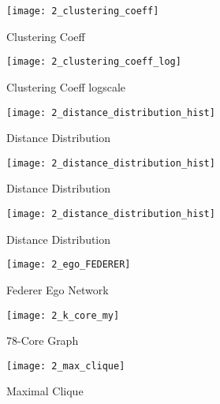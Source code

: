\documentclass[runningheads]{llncs}
\begin{document}
\begin{figure}
    \centering
    \begin{minipage}{0.5\textwidth}
        \centering
        \texttt{[image: 2\_clustering\_coeff]} %
        \caption{Clustering Coeff}
        \label{fig_2_clustering_coeff}
    \end{minipage}\hfill
    \begin{minipage}{0.5\textwidth}
        \centering
        \texttt{[image: 2\_clustering\_coeff\_log]} %
        \caption{Clustering Coeff logscale}
        \label{fig_2_clustering_coeff_log}
    \end{minipage}
\end{figure}


\begin{figure}
\texttt{[image: 2\_distance\_distribution\_hist]}
\caption{Distance Distribution} \label{fig_2_distance_distribution_hist}
\end{figure}


\begin{figure}
\texttt{[image: 2\_distance\_distribution\_hist]}
\caption{Distance Distribution} \label{fig_2_distance_distribution_hist}
\end{figure}


\begin{figure}
\texttt{[image: 2\_distance\_distribution\_hist]}
\caption{Distance Distribution} \label{fig_2_distance_distribution_hist}
\end{figure}

\begin{figure}
\texttt{[image: 2\_ego\_FEDERER]}
\caption{Federer Ego Network} \label{fig_22_ego_FEDERER}
\end{figure}


\begin{figure}
    \centering
    \begin{minipage}{0.5\textwidth}
        \centering
        \texttt{[image: 2\_k\_core\_my]} %
        \caption{78-Core Graph}
        \label{fig_2_k_core_my}
    \end{minipage}\hfill
    \begin{minipage}{0.5\textwidth}
        \centering
        \texttt{[image: 2\_max\_clique]} %
        \caption{Maximal Clique}
        \label{fig_2_max_clique}
    \end{minipage}
\end{figure}
\end{document}
